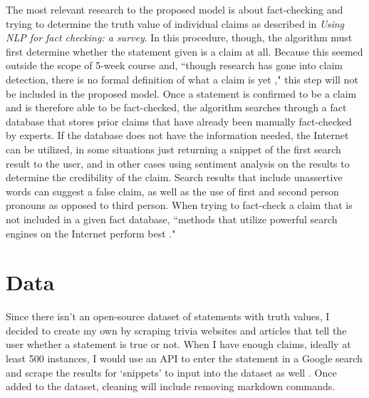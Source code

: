 \documentclass[]{article}
\begin{document}
		The most relevant research to the proposed model is about fact-checking and trying to determine the truth value of individual claims as described in \textit{Using NLP for fact checking: a survey}. In this procedure, though, the algorithm must first determine whether the statement given is a claim at all. Because this seemed outside the scope of 5-week course and, ``though research has gone into claim detection, there is no formal definition of what a claim is yet \cite{lazarski21}," this step will not be included in the proposed model. Once a statement is confirmed to be a claim and is therefore able to be fact-checked, the algorithm searches through a fact database that stores prior claims that have already been manually fact-checked by experts. If the database does not have the information needed, the Internet can be utilized, in some situations just returning a snippet of the first search result to the user, and in other cases using sentiment analysis on the results to determine the credibility of the claim. Search results that include unassertive words can suggest a false claim, as well as the use of first and second person pronouns as opposed to third person. When trying to fact-check a claim that is not included in a given fact database, ``methods that utilize powerful search engines on the Internet perform best \cite{lazarski21}."
			
	
	\section{Data}
	
		
		Since there isn't an open-source dataset of statements with truth values, I decided to create my own by scraping trivia websites and articles that tell the user whether a statement is true or not. When I have enough claims, ideally at least 500 instances, I would use an API to enter the statement in a Google search and scrape the results for `snippets' to input into the dataset as well \cite{k_api}. Once added to the dataset, cleaning will include removing markdown commands.
		
		
\end{document}
